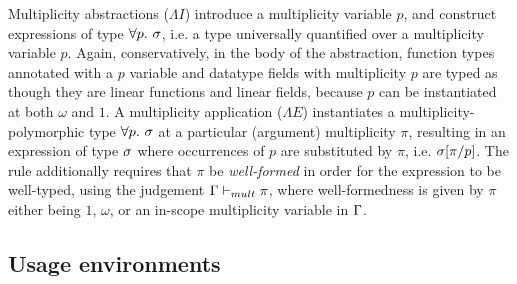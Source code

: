 \documentclass[acmsmall,review,anonymous,screen]{acmart}
\begin{document}
Multiplicity abstractions ($\Lambda I$) introduce a multiplicity variable $p$,
and construct expressions of type $\forall p.~\sigma$, i.e. a type universally
quantified over a multiplicity variable $p$. Again, conservatively, in the body
of the abstraction, function types annotated with a $p$ variable and datatype
fields with multiplicity $p$ are typed as though they are linear functions and
linear fields, because $p$ can be instantiated at both $\omega$ and $1$.
A multiplicity application ($\Lambda E$) instantiates a multiplicity-polymorphic type
$\forall p.~\sigma$ at a particular (argument) multiplicity $\pi$, resulting in an
expression of type $\sigma$ where occurrences of $p$ are substituted by $\pi$, i.e.
$\sigma[\pi/p]$.
The rule additionally requires that $\pi$ be \emph{well-formed} in order
for the expression to be well-typed, using the judgement $\Gamma \vdash_{mult}
\pi$, where well-formedness is given by $\pi$ either being $1$, $\omega$, or an
in-scope  multiplicity variable in $\Gamma$.



\subsection{Usage environments\label{sec:usage-environments}}
\end{document}
